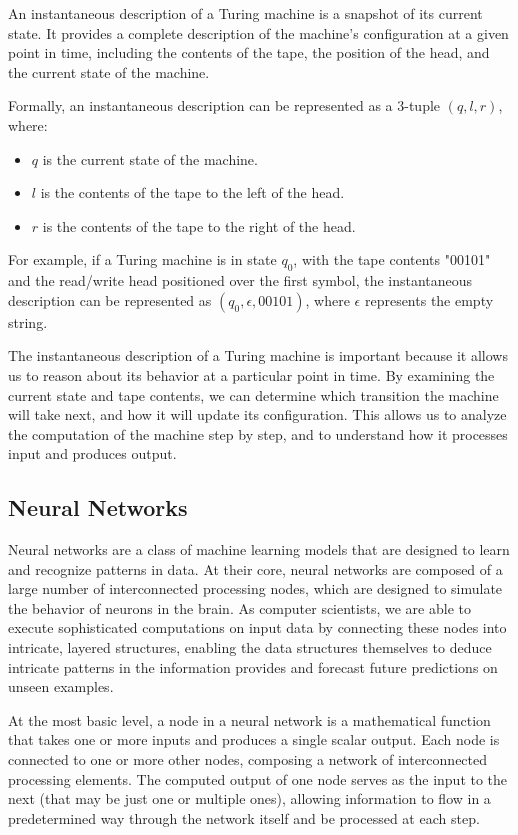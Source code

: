 \documentclass{article}
\begin{document}
An instantaneous description of a Turing machine is a snapshot of its current state. It provides a complete description of the machine's configuration at a given point in time, including the contents of the tape, the position of the head, and the current state of the machine.

Formally, an instantaneous description can be represented as a 3-tuple $(q, l, r)$, where:

\begin{itemize}
    \item $q$ is the current state of the machine.
    \item $l$ is the contents of the tape to the left of the head.
    \item $r$ is the contents of the tape to the right of the head.
\end{itemize}

For example, if a Turing machine is in state $q_0$, with the tape contents "00101" and the read/write head positioned over the first symbol, the instantaneous description can be represented as $(q_0, \epsilon, 00101)$, where $\epsilon$ represents the empty string.

The instantaneous description of a Turing machine is important because it allows us to reason about its behavior at a particular point in time. By examining the current state and tape contents, we can determine which transition the machine will take next, and how it will update its configuration. This allows us to analyze the computation of the machine step by step, and to understand how it processes input and produces output.

\subsection{Neural Networks}

Neural networks are a class of machine learning models that are designed to learn and recognize patterns in data. At their core, neural networks are composed of a large number of interconnected processing nodes, which are designed to simulate the behavior of neurons in the brain. As computer scientists, we are able to execute sophisticated computations on input data by connecting these nodes into intricate, layered structures, enabling the data structures themselves to deduce intricate patterns in the information provides and forecast future predictions on unseen examples.

At the most basic level, a node in a neural network is a mathematical function that takes one or more inputs and produces a single scalar output. Each node is connected to one or more other nodes, composing a network of interconnected processing elements. The computed output of one node serves as the input to the next (that may be just one or multiple ones), allowing information to flow in a predetermined way through the network itself and be processed at each step.
\end{document}

